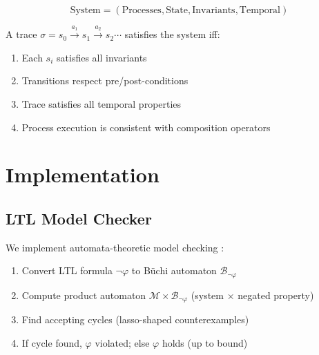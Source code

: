 \documentclass[conference]{IEEEtran}
\begin{document}
\begin{equation}
\text{System} = (\text{Processes}, \text{State}, \text{Invariants}, \text{Temporal})
\end{equation}

A trace $\sigma = s_0 \xrightarrow{a_1} s_1 \xrightarrow{a_2} s_2 \cdots$ satisfies the system iff:
\begin{enumerate}
\item Each $s_i$ satisfies all invariants
\item Transitions respect pre/post-conditions
\item Trace satisfies all temporal properties
\item Process execution is consistent with composition operators
\end{enumerate}

\section{Implementation}
\label{sec:implementation}

\subsection{LTL Model Checker}

We implement automata-theoretic model checking \cite{vardi1996}:

\begin{enumerate}
\item Convert LTL formula $\neg\varphi$ to Büchi automaton $\mathcal{B}_{\neg\varphi}$
\item Compute product automaton $\mathcal{M} \times \mathcal{B}_{\neg\varphi}$ (system $\times$ negated property)
\item Find accepting cycles (lasso-shaped counterexamples)
\item If cycle found, $\varphi$ violated; else $\varphi$ holds (up to bound)
\end{enumerate}
\end{document}
